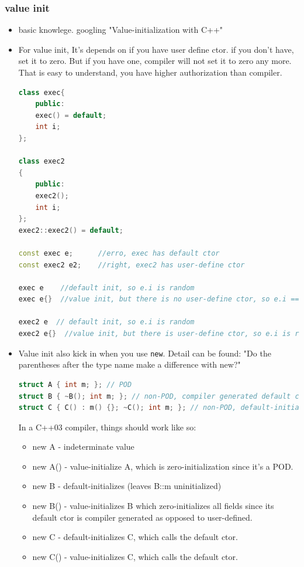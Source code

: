 \documentclass[a4paper,12pt,twoside]{book}
\begin{document}
\subsubsection{value init}
\begin{itemize}
	\item basic knowlege. googling "Value-initialization with C++"
	
	\item For value init, It's depends on if you have user define ctor. if you don't have, set it to zero. But if you have one, compiler will not set it to zero any more. That is easy to understand, you have higher authorization than compiler. 
	
\begin{lstlisting}[frame=single, language=c++]
class exec{
	public:
	exec() = default;
	int i;
};
	
class exec2
{
	public:
	exec2();
	int i;
};
exec2::exec2() = default;
	
const exec e;      //erro, exec has default ctor
const exec2 e2;    //right, exec2 has user-define ctor

exec e    //default init, so e.i is random
exec e{}  //value init, but there is no user-define ctor, so e.i == 0
	
exec2 e  // default init, so e.i is random
exec2 e{}  //value init, but there is user-define ctor, so e.i is random
\end{lstlisting}
	
	\item Value init also kick in when you use \texttt{new}. Detail can be found: "Do the parentheses after the type name make a difference with new?"
	
\begin{lstlisting}[frame=single, language=c++]
struct A { int m; }; // POD
struct B { ~B(); int m; }; // non-POD, compiler generated default ctor
struct C { C() : m() {}; ~C(); int m; }; // non-POD, default-initialising m
\end{lstlisting}
	
	In a C++03 compiler, things should work like so:
	\begin{itemize}
		\item new A - indeterminate value
		\item new A() - value-initialize A, which is zero-initialization since it's a POD.
		
		\item new B - default-initializes (leaves B::m uninitialized)
		
		\item new B() - value-initializes B which zero-initializes all fields since its default ctor is compiler generated as opposed to user-defined.
		
		\item new C - default-initializes C, which calls the default ctor.
		
		\item new C() - value-initializes C, which calls the default ctor.
	\end{itemize}
\end{itemize}
\end{document}
